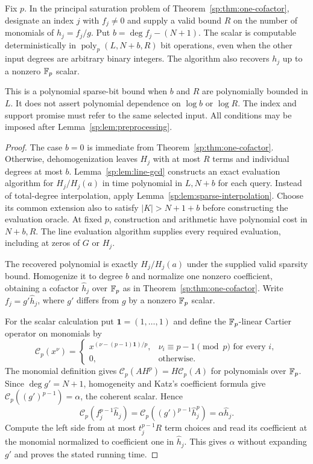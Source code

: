 \begin{theorem}
\label{sp:thm:sparse-cofactor}
Fix $p$. In the principal saturation problem of
Theorem~\ref{sp:thm:one-cofactor}, designate an index $j$ with $f_j\ne0$ and supply a
valid bound $R$ on the number of monomials of $h_j=f_j/g$.
Put $b=\deg f_j-(N+1)$. The scalar is computable deterministically
in $\operatorname{poly}_p(L,N+b,R)$ bit operations, even when the
other input degrees are arbitrary binary integers. The algorithm also
recovers $h_j$ up to a nonzero $\mathbb F_p$ scalar.

This is a polynomial sparse-bit bound when $b$ and $R$ are
polynomially bounded in $L$. It does not assert polynomial dependence
on $\log b$ or $\log R$. The index and support promise must refer
to the same selected input. All conditions may be imposed after
Lemma~\ref{sp:lem:preprocessing}.
\end{theorem}
\begin{proof}
The case $b=0$ is immediate from
Theorem~\ref{sp:thm:one-cofactor}. Otherwise, dehomogenization leaves
$H_j$ with at most $R$ terms and individual degrees at most $b$.
Lemma~\ref{sp:lem:line-gcd} constructs an exact evaluation algorithm
for $H_j/H_j(a)$ in time polynomial in $L,N+b$ for each query.
Instead of total-degree interpolation, apply
Lemma~\ref{sp:lem:sparse-interpolation}. Choose its common extension
also to satisfy $|K|>N+1+b$ before constructing the evaluation oracle.
At fixed $p$, construction and arithmetic have polynomial cost in
$N+b,R$. The line evaluation algorithm supplies every required
evaluation, including at zeros of $G$ or $H_j$.

The recovered polynomial is exactly $H_j/H_j(a)$ under the supplied
valid sparsity bound. Homogenize it to degree $b$ and normalize one
nonzero coefficient, obtaining a cofactor $\widehat h_j$ over $\mathbb F_p$ as in
Theorem~\ref{sp:thm:one-cofactor}. Write $f_j=g'\widehat h_j$, where
$g'$ differs from $g$ by a nonzero $\mathbb F_p$ scalar.

For the scalar calculation put $\mathbf 1=(1,\ldots,1)$ and define
the $\mathbb F_p$-linear Cartier operator
on monomials by
\[
 \mathcal C_p(x^\nu)=
 \begin{cases}
 x^{(\nu-(p-1)\mathbf 1)/p},&
          \nu_i\equiv p-1\pmod p\text{ for every }i,\\
 0,&\text{otherwise}.
 \end{cases}
\]
The monomial definition gives
$\mathcal C_p(AH^p)=H\mathcal C_p(A)$ for polynomials over $\mathbb F_p$.
Since $\deg g'=N+1$, homogeneity and Katz's coefficient formula give
$\mathcal C_p((g')^{p-1})=\alpha$, the coherent scalar. Hence
\[
 \mathcal C_p(f_j^{p-1}\widehat h_j)
   =\mathcal C_p((g')^{p-1}\widehat h_j^p)
   =\alpha\widehat h_j.
\]
Compute the left side from at most $t_j^{p-1}R$ term choices and
read its coefficient at the monomial normalized to coefficient one
in $\widehat h_j$. This gives $\alpha$ without expanding $g'$ and
proves the stated running time.
\end{proof}

